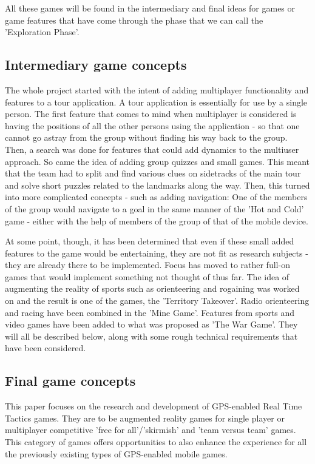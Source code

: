 \documentclass{article}
\begin{document}
All these games will be found in the intermediary and final ideas for games or
game features that have come through the phase that we can call the
'Exploration Phase'.


\subsection{Intermediary game concepts}

The whole project started with the intent of adding multiplayer functionality
and features to a tour application. A tour application is essentially for use by
a single person. The first feature that comes to mind when multiplayer is
considered is having the positions of all the other persons using the
application - so that one cannot go astray from the group without finding his
way back to the group. Then, a search was done for features that could add
dynamics to the multiuser approach. So came the idea of adding group quizzes and
small games. This meant that the team had to split and find various clues on
sidetracks of the main tour and solve short puzzles related to the landmarks
along the way. Then, this turned into more complicated concepts - such as adding
navigation: One of the members of the group would navigate to a goal in the same
manner of the 'Hot and Cold' game - either with the help of members of the group
of that of the mobile device.\newline

At some point, though, it has been determined that even if these small added
features to the game would be entertaining, they are not fit as research
subjects - they are already there to be implemented. Focus has moved to rather
full-on games that would implement something not thought of thus far. The idea
of augmenting the reality of sports such as orienteering and rogaining was
worked on and the result is one of the games, the 'Territory Takeover'. Radio
orienteering and racing have been combined in the 'Mine Game'. Features from
sports and video games have been added to what was proposed as 'The War Game'.
They will all be described below, along with some rough technical requirements
that have been considered.

\subsection{Final game concepts}

This paper focuses on the research and development of GPS-enabled Real
Time Tactics games. They are to be augmented reality games for single player or
multiplayer competitive 'free for all'/'skirmish' and 'team versus team'
games. This category of games offers opportunities to also enhance the
experience for all the previously existing types of GPS-enabled mobile games.
\end{document}
